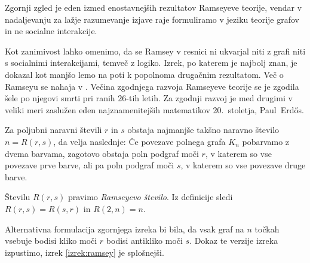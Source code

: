 \documentclass[twoside,11pt]{article}
\begin{document}
Zgornji zgled je eden izmed enostavnejših rezultatov Ramseyeve teorije, vendar v nadaljevanju
za lažje razumevanje izjave raje formuliramo v jeziku teorije grafov in ne socialne interakcije.

Kot zanimivost lahko omenimo, da se Ramsey v 
resnici ni ukvarjal niti z grafi niti s socialnimi interakcijami, temveč z logiko. Izrek, po katerem 
je najbolj znan, je dokazal kot manjšo lemo na poti k popolnoma drugačnim rezultatom. Več 
o Ramseyu se nahaja v \cite[poglavje 30]{color}. Večina zgodnjega razvoja 
Ramseyeve teorije se je zgodila šele po njegovi smrti pri ranih $26$-tih letih. Za zgodnji razvoj je 
med drugimi v veliki meri zaslužen eden najznamenitejših matematikov 20.~stoletja, 
Paul~Erdős.

\begin{izrek}[Ramsey] \label{izrek:ramseyosnovni}
    Za poljubni naravni števili $r$ in $s$ obstaja najmanjše takšno naravno število 
    $n = R(r,s)$, da velja naslednje: Če povezave polnega grafa $K_n$ pobarvamo z dvema barvama, 
    zagotovo obstaja poln podgraf moči $r$, v katerem so vse povezave prve barve, ali pa poln 
    podgraf moči $s$, v katerem so vse povezave druge barve.
\end{izrek}

Številu $R(r, s)$ pravimo \emph{Ramseyevo število}.
Iz definicije sledi $R(r, s) = R(s, r)$ in $R(2, n) = n$.


Alternativna formulacija zgornjega izreka bi bila, da vsak graf na $n$ točkah vsebuje 
bodisi kliko moči $r$ bodisi antikliko moči $s$.
Dokaz te verzije izreka izpustimo, izrek \ref{izrek:ramsey} je splošnejši.
\end{document}
